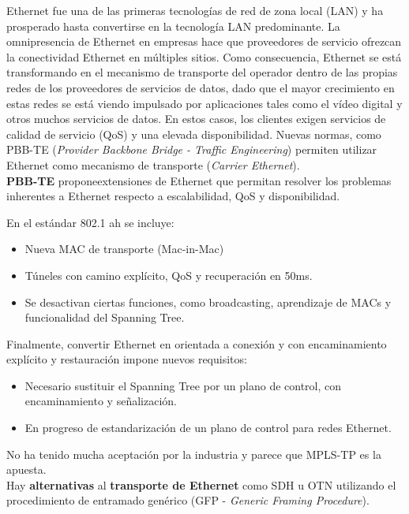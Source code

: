 \documentclass[10pt,portrait, twocolumn]{article}
\begin{document}
Ethernet fue una de las primeras tecnologías de red de zona local (LAN) y ha prosperado hasta convertirse en la tecnología LAN predominante. La omnipresencia de Ethernet en empresas hace que proveedores de servicio ofrezcan la conectividad Ethernet en múltiples sitios. Como consecuencia, Ethernet se está transformando en el mecanismo de transporte del operador dentro de las propias redes de los proveedores de servicios de datos, dado que el mayor crecimiento en estas redes se está viendo impulsado por aplicaciones tales como el vídeo digital y otros muchos servicios de datos. En estos casos, los clientes exigen servicios de calidad de servicio (QoS) y una elevada disponibilidad.  Nuevas normas, como PBB-TE (\textit{Provider Backbone Bridge - Traffic Engineering}) permiten utilizar Ethernet como mecanismo de transporte (\textit{Carrier Ethernet}).\\

\textbf{PBB-TE} proponeextensiones de Ethernet que permitan resolver los problemas inherentes a Ethernet respecto a escalabilidad, QoS y disponibilidad. 

	\quad En el estándar 802.1 ah se incluye:
	
		\begin{itemize}
		\item Nueva MAC de transporte (Mac-in-Mac)
		\item Túneles con camino explícito, QoS y recuperación en 50ms.
		\item Se desactivan ciertas funciones, como broadcasting, aprendizaje de MACs y funcionalidad del Spanning Tree.
		\end{itemize}

Finalmente, convertir Ethernet en orientada a conexión y con encaminamiento explícito y restauración impone nuevos requisitos:

	\begin{itemize}
	\item Necesario sustituir el Spanning Tree por un plano de control, con encaminamiento y señalización.
	\item En progreso de estandarización de un plano de control para redes Ethernet.
	\end{itemize}
	
No ha tenido mucha aceptación por la industria y parece que MPLS-TP es la apuesta.\\

Hay \textbf{alternativas} al \textbf{transporte de Ethernet} como SDH u OTN utilizando el procedimiento de entramado genérico (GFP - \textit{Generic Framing Procedure}).\\
\end{document}
